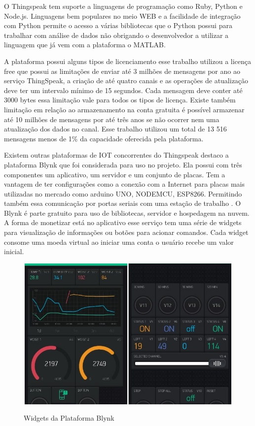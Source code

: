 O Thingspeak tem suporte a linguagens de programação como Ruby, Python e Node.js. Linguagens bem populares no meio WEB e a facilidade de integração com Python permite o acesso a várias bibliotecas que o Python possui para trabalhar com análise de dados não obrigando o desenvolvedor a utilizar a linguagem que já vem com a plataforma o MATLAB.

A plataforma possui alguns tipos de licenciamento esse trabalho utilizou a licença free que possui as limitações de enviar até 3 milhões de mensagens por ano ao serviço ThingSpeak, a criação de até quatro canais e as operações de atualização deve ter um intervalo mínimo de 15 segundos. Cada mensagem deve conter até 3000 bytes essa limitação vale para todos os tipos de licença. Existe também limitação em relação ao armazenamento na conta gratuita é possível armazenar até 10 milhões de mensagens por até três anos se não ocorrer nem uma atualização dos dados no canal. Esse trabalho utilizou um total de 13 516 mensagens menos de 1\% da capacidade oferecida pela plataforma.

Existem outras plataformas de IOT concorrentes do Thingspeak destaco a plataforma Blynk que foi considerada para uso no projeto. Ela possui com três componentes um aplicativo, um servidor e um conjunto de placas. Tem a vantagem de ter configurações como a conexão com a Internet para placas mais utilizadas no mercado como arduino UNO, NODEMCU, ESP8266. Permitindo também essa comunicação por portas seriais com uma estação de trabalho \cite{8473224}. O Blynk é parte gratuito para uso de bibliotecas, servidor e hospedagem na nuvem. A forma de monetizar está no aplicativo esse serviço tem uma série de widgets para visualização de informações ou botões para acionar comandos. Cada widget consome uma moeda virtual ao iniciar uma conta o usuário recebe um valor inicial.

\begin{figure}[h!]
    \centering
    \caption{Widgets da Plataforma Blynk}
    \includegraphics[scale=0.5]{Figuras/blynk_app.jpg}
    \label{fig:blynk}
\end{figure}



